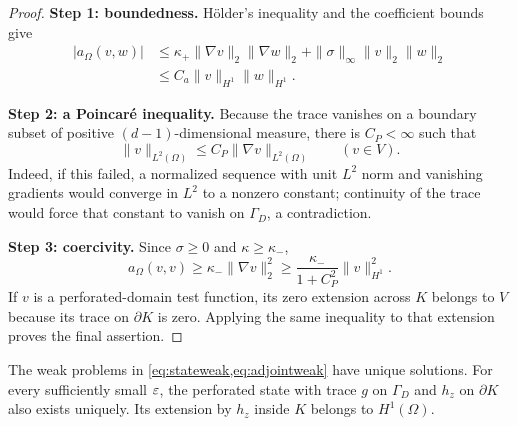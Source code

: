 \begin{proof}
\textbf{Step 1: boundedness.}
H\"older's inequality and the coefficient bounds give
\begin{align}
 |a_\Omega(v,w)|
 &\le \kappa_+\|\nabla v\|_2\|\nabla w\|_2
   +\|\sigma\|_\infty\|v\|_2\|w\|_2\\
 &\le C_a\|v\|_{H^1}\|w\|_{H^1}.
\end{align}

\textbf{Step 2: a Poincar\'e inequality.}
Because the trace vanishes on a boundary subset of positive
$(d-1)$-dimensional measure, there is $C_P<\infty$ such that
\begin{equation}
 \|v\|_{L^2(\Omega)}\le C_P\|\nabla v\|_{L^2(\Omega)}
 \qquad(v\in V).
 \label{eq:mixedpoincare}
\end{equation}
Indeed, if this failed, a normalized sequence with unit $L^2$ norm and
vanishing gradients would converge in $L^2$ to a nonzero constant; continuity
of the trace would force that constant to vanish on $\Gamma_D$, a
contradiction.

\textbf{Step 3: coercivity.}
Since $\sigma\ge0$ and $\kappa\ge\kappa_-$,
\begin{equation}
 a_\Omega(v,v)\ge\kappa_-\|\nabla v\|_2^2
 \ge\frac{\kappa_-}{1+C_P^2}\|v\|_{H^1}^2.
\end{equation}
If $v$ is a perforated-domain test function, its zero extension across $K$
belongs to $V$ because its trace on $\partial K$ is zero.  Applying the same
inequality to that extension proves the final assertion.
\end{proof}

\begin{proposition}
\label{prop:wellposedness}
The weak problems in \cref{eq:stateweak,eq:adjointweak} have unique solutions.
For every sufficiently small $\varepsilon$, the perforated state with trace $g$ on
$\Gamma_D$ and $h_z$ on $\partial K$ also exists uniquely.  Its extension by
$h_z$ inside $K$ belongs to $H^1(\Omega)$.
\end{proposition}

